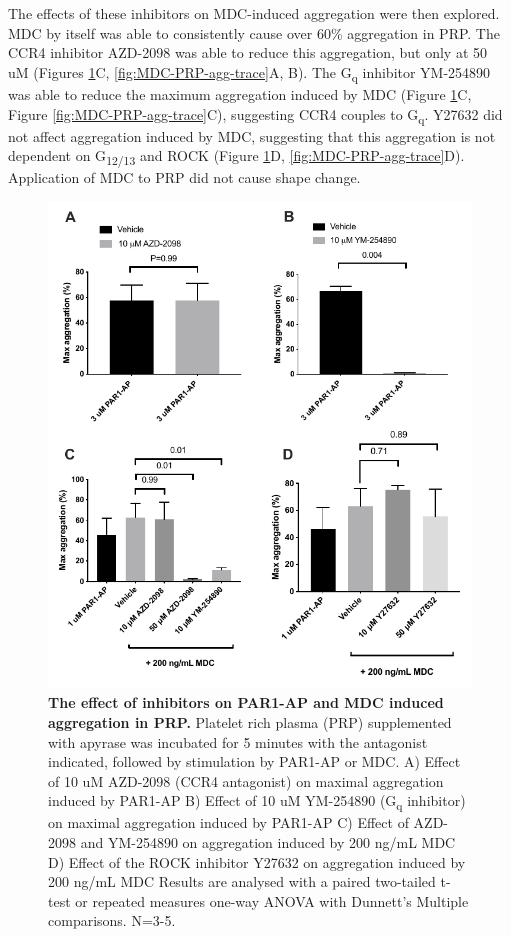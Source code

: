 \documentclass[11pt,twoside]{bristolthesis}
\begin{document}
The effects of these inhibitors on MDC-induced aggregation were then explored. MDC by itself was able to consistently cause over 60\% aggregation in PRP. The CCR4 inhibitor AZD-2098 was able to reduce this aggregation, but only at 50 uM (Figures \ref{fig:MDC-PRP-agg-bar}C, \ref{fig:MDC-PRP-agg-trace}A, B). The G\textsubscript{q} inhibitor YM-254890 was able to reduce the maximum aggregation induced by MDC (Figure \ref{fig:MDC-PRP-agg-bar}C, Figure \ref{fig:MDC-PRP-agg-trace}C), suggesting CCR4 couples to G\textsubscript{q}. Y27632 did not affect aggregation induced by MDC, suggesting that this aggregation is not dependent on G\textsubscript{12/13} and ROCK (Figure \ref{fig:MDC-PRP-agg-bar}D, \ref{fig:MDC-PRP-agg-trace}D). Application of MDC to PRP did not cause shape change.



\begin{figure}

{\centering \includegraphics[width=0.95\linewidth]{figure/Chemokines/Layouts/PAR1_MDC_inhibitors_aggregation} 

}

\caption[The effect of inhibitors on PAR1-AP and MDC induced aggregation in PRP.]{\textbf{The effect of inhibitors on PAR1-AP and MDC induced aggregation in PRP.} Platelet rich plasma (PRP) supplemented with apyrase was incubated for 5 minutes with the antagonist indicated, followed by stimulation by PAR1-AP or MDC. A) Effect of 10 uM AZD-2098 (CCR4 antagonist) on maximal aggregation induced by PAR1-AP B) Effect of 10 uM YM-254890 (G\textsubscript{q} inhibitor) on maximal aggregation induced by PAR1-AP C) Effect of AZD-2098 and YM-254890 on aggregation induced by 200 ng/mL MDC D) Effect of the ROCK inhibitor Y27632 on aggregation induced by 200 ng/mL MDC Results are analysed with a paired two-tailed t-test or repeated measures one-way ANOVA with Dunnett's Multiple comparisons. N=3-5.}\label{fig:MDC-PRP-agg-bar}
\end{figure}
\end{document}
